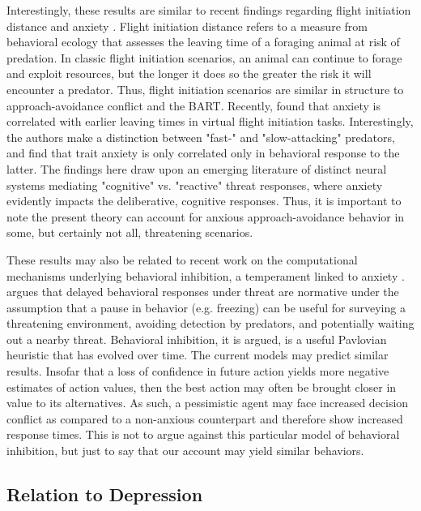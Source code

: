 \documentclass[11pt]{article} %
\begin{document}
Interestingly, these results are similar to recent findings regarding flight initiation distance and anxiety \citep{Mobbs2018, Mobbs2019}. Flight initiation distance refers to a measure from behavioral ecology that assesses the leaving time of a foraging animal at risk of predation. In classic flight initiation scenarios, an animal can continue to forage and exploit resources, but the longer it does so the greater the risk it will encounter a predator. Thus, flight initiation scenarios are similar in structure to approach-avoidance conflict and the BART. Recently, \cite{Mobbs2019} found that anxiety is correlated with earlier leaving times in virtual flight initiation tasks. Interestingly, the authors make a distinction between "fast-" and "slow-attacking" predators, and find that trait anxiety is only correlated only in behavioral response to the latter. The findings here draw upon an emerging literature of distinct neural systems mediating "cognitive" vs. "reactive" threat responses, where anxiety evidently impacts the deliberative, cognitive responses. Thus, it is important to note the present theory can account for anxious approach-avoidance behavior in some, but certainly not all, threatening scenarios.

These results may also be related to recent work on the computational mechanisms underlying behavioral inhibition, a temperament linked to anxiety \citep{bach2015, khemka2017}. \cite{bach2015} argues that delayed behavioral responses under threat are normative under the assumption that a pause in behavior (e.g. freezing) can be useful for surveying a threatening environment, avoiding detection by predators, and potentially waiting out a nearby threat. Behavioral inhibition, it is argued, is a useful Pavlovian heuristic that has evolved over time. The current models may predict similar results. Insofar that a loss of confidence in future action yields more negative estimates of action values, then the best action may often be brought closer in value to its alternatives. As such, a pessimistic agent may face increased decision conflict as compared to a non-anxious counterpart and therefore show increased response times. This is not to argue against this particular model of behavioral inhibition, but just to say that our account may yield similar behaviors.

\subsection{Relation to Depression}
\end{document}
